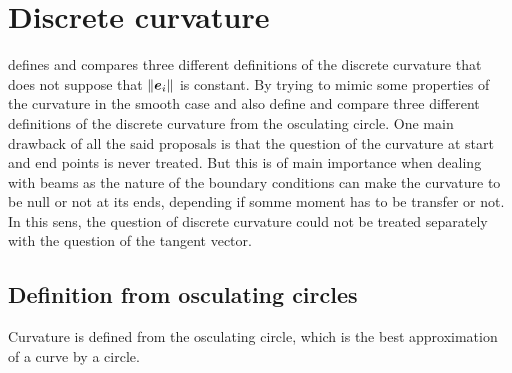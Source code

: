 \section{Discrete curvature}\label{sec:discrete_curvature}
 defines and compares three different definitions of the discrete curvature that does not suppose that $\lVert\boldsymbol{e}_i\rVert$ is constant. By trying to mimic some properties of the curvature in the smooth case  and  also define and compare three different definitions of the discrete curvature from the osculating circle. One main drawback of all the said proposals is that the question of the curvature at  start and end points is never treated. But this is of main importance when dealing with beams as the nature of the boundary conditions can make the curvature to be null or not at its ends, depending if somme moment has to be transfer or not. In this sens, the question of discrete curvature could not be treated separately with the question of the tangent vector.

\subsection{Definition from osculating circles}
Curvature is defined from the osculating circle, which is the best approximation of a curve by a circle.

